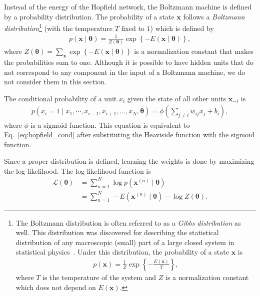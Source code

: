 \documentclass{now}
\newcommand{\vect}[1]{\mathbf{#1}}
\newcommand{\vects}[1]{\boldsymbol{#1}}
\newcommand{\vx}[0]{\vect{x}}
\newcommand{\TT}[0]{{\vects{\theta}}}
\newcommand{\LL}[0]{\mathcal{L}}
\begin{document}
Instead of the energy of the Hopfield network, the Boltzmann
machine is defined by a probability distribution. The
probability of a state $\vx$ follows a \textit{Boltzmann
distribution}\footnote{
    The Boltzmann distribution is often referred to as a \textit{Gibbs
    distribution} as well. This distribution was discovered for describing the
    statistical distribution of any macroscopic (small) part of a large closed
    system in statistical physics~\citep[see, e.g.,][]{Landau1980}. Under this
    distribution, the probability of a state $\vx$ is
\begin{align*}
    p(\vx) = \frac{1}{Z} \exp\left\{ -\frac{E(\vx)}{T}
    \right\},
\end{align*}
where $T$ is the temperature of the system and $Z$ is a normalization constant
which does not depend on $E(\vx)$.
}
(with the temperature $T$ fixed to $1$) which is defined by
\begin{align}
    \label{eq:bm}
    p(\vx \mid \TT) = \frac{1}{Z(\TT)} \exp \left\{
    -E\left(\vx \mid \TT \right)\right\},
\end{align}
where $Z(\TT)=\sum_{\vx} \exp\left\{ -E(\vx \mid \TT) \right\}$ is a
normalization constant that makes the probabilities sum to one. Although it
is possible to have hidden units that do not correspond to any component in the
input of a Boltzmann machine, we do not consider them in this section.

The conditional probability of a unit $x_i$ given the state of all other units
$\vx_{-i}$ is
\begin{align}
    \label{eq:bm_cond}
    p(x_i = 1 \mid x_1, \cdots, x_{i-1}, x_{i+1}, \dots ,x_N,
    \TT) = \phi\left( \sum_{j \neq i} w_{ij} x_j + b_i
    \right),
\end{align}
where $\phi$ is a sigmoid function. This equation is equivalent to
Eq.~\eqref{eq:hopfield_cond} after substituting the Heaviside function with the
sigmoid function. 

Since a proper distribution is defined, learning the weights is done by
maximizing the log-likelihood. The log-likelihood function is 
\begin{align}
    \label{eq:fvbm_ll}
    \LL(\TT) &= \sum_{n=1}^N \log p(\vx^{(n)} \mid \TT) 
    \nonumber
    \\
    &= \sum_{n=1}^N -E\left( \vx^{(n)} \mid \TT \right) -
    \log Z(\TT).
\end{align}
\end{document}
